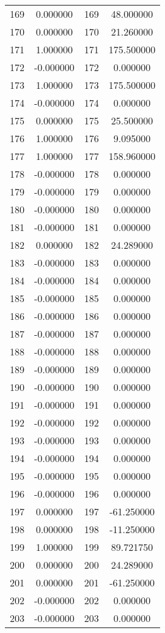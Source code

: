 \documentclass[12pt]{article}
\begin{document}
\begin{longtable}{@{}cccc@{}}
169 & 0.000000 & 169 & 48.000000 \\
170 & 0.000000 & 170 & 21.260000 \\
171 & 1.000000 & 171 & 175.500000 \\
172 & -0.000000 & 172 & 0.000000 \\
173 & 1.000000 & 173 & 175.500000 \\
174 & -0.000000 & 174 & 0.000000 \\
175 & 0.000000 & 175 & 25.500000 \\
176 & 1.000000 & 176 & 9.095000 \\
177 & 1.000000 & 177 & 158.960000 \\
178 & -0.000000 & 178 & 0.000000 \\
179 & -0.000000 & 179 & 0.000000 \\
180 & -0.000000 & 180 & 0.000000 \\
181 & -0.000000 & 181 & 0.000000 \\
182 & 0.000000 & 182 & 24.289000 \\
183 & -0.000000 & 183 & 0.000000 \\
184 & -0.000000 & 184 & 0.000000 \\
185 & -0.000000 & 185 & 0.000000 \\
186 & -0.000000 & 186 & 0.000000 \\
187 & -0.000000 & 187 & 0.000000 \\
188 & -0.000000 & 188 & 0.000000 \\
189 & -0.000000 & 189 & 0.000000 \\
190 & -0.000000 & 190 & 0.000000 \\
191 & -0.000000 & 191 & 0.000000 \\
192 & -0.000000 & 192 & 0.000000 \\
193 & -0.000000 & 193 & 0.000000 \\
194 & -0.000000 & 194 & 0.000000 \\
195 & -0.000000 & 195 & 0.000000 \\
196 & -0.000000 & 196 & 0.000000 \\
197 & 0.000000 & 197 & -61.250000 \\
198 & 0.000000 & 198 & -11.250000 \\
199 & 1.000000 & 199 & 89.721750 \\
200 & 0.000000 & 200 & 24.289000 \\
201 & 0.000000 & 201 & -61.250000 \\
202 & -0.000000 & 202 & 0.000000 \\
203 & -0.000000 & 203 & 0.000000 \\

\end{longtable}
\end{document}
